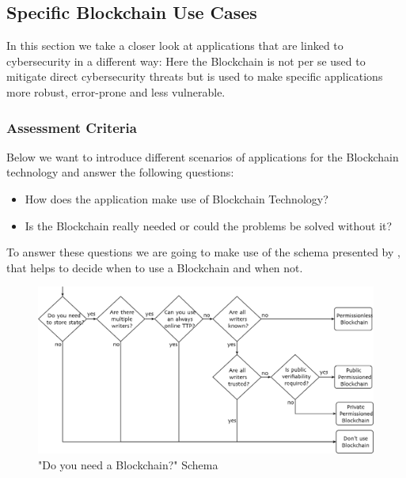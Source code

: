 \subsection{Specific Blockchain Use Cases}
\label{subsec:03_applications}

In this section we take a closer look at applications that are linked to cybersecurity in a different way: Here the Blockchain is not per se used to mitigate direct cybersecurity threats but is used to make specific applications more robust, error-prone and less vulnerable.

\subsubsection{Assessment Criteria}
Below we want to introduce different scenarios of applications for the Blockchain technology and answer the following questions:
\begin{itemize}
    \item How does the application make use of Blockchain Technology?
    \item Is the Blockchain really needed or could the problems be solved without it?
\end{itemize}
To answer these questions we are going to make use of the schema presented by \cite{Wust2017}, that helps to decide when to use a Blockchain and when not.
\begin{figure}[ht!]
    \begin{center}
        \includegraphics[scale=0.6]{Talk7/img/app/BCorNot}
    \end{center}
    \caption{"Do you need a Blockchain?" Schema \cite{Wust2017}}
    \label{Blockchain_or_not}
\end{figure}


